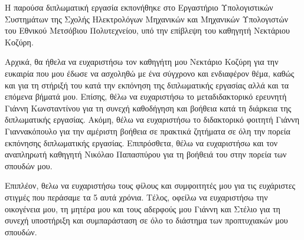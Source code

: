 
\author{Θάλεια-Δήμητρα Δούδαλη}
\date{Ιούλιος 2015}

\begin{acknowledgementsgr}
 
 Η παρούσα διπλωματική εργασία εκπονήθηκε στο Εργαστήριο Υπολογιστικών Συστημάτων της Σχολής Ηλεκτρολόγων Μηχανικών και Μηχανικών Υπολογιστών του 
 Εθνικού Μετσόβιου Πολυτεχνείου, υπό την επίβλεψη του καθηγητή Νεκτάριου Κοζύρη. 
 
 Αρχικά, θα ήθελα να ευχαριστήσω τον καθηγήτη μου Νεκτάριο Κοζύρη για την ευκαιρία που μου έδωσε να ασχοληθώ με ένα σύγχρονο και ενδιαφέρον θέμα, καθώς και 
 για τη στήριξή του κατά την εκπόνηση της διπλωματικής εργασίας αλλά και τα επόμενα βήματά μου. Επίσης, θέλω να ευχαριστήσω το μεταδιδακτορικό ερευνητή 
 Γιάννη Κωνσταντίνου για τη συνεχή καθοδήγηση και βοήθεια κατά τη διάρκεια της διπλωματικής εργασίας. Ακόμη, θέλω να ευχαριστήσω το 
 διδακτορικό φοιτητή Γιάννη Γιαννακόπουλο για την αμέριστη βοήθεια σε πρακτικά ζητήματα σε όλη την πορεία εκπόνησης διπλωματικής εργασίας. 
 Επιπρόσθετα, θέλω να ευχαριστήσω και τον αναπληρωτή καθηγητή Νικόλαο Παπασπύρου για τη βοήθειά του στην πορεία των σπουδών μου. 
 
 Επιπλέον, θελω να ευχαριστήσω τους φίλους και συμφοιτητές μου για τις ευχάριστες στιγμές που περάσαμε τα 5 αυτά χρόνια. 
 Τέλος, οφείλω να ευχαριστήσω την οικογένεια μου, τη μητέρα μου και τους αδερφούς μου Γιάννη και Στέλιο για τη συνεχή υποστήριξη και 
 συμπαράσταση σε όλο το διάστημα των προπτυχιακών μου σπουδών. 
 
\end{acknowledgementsgr}
